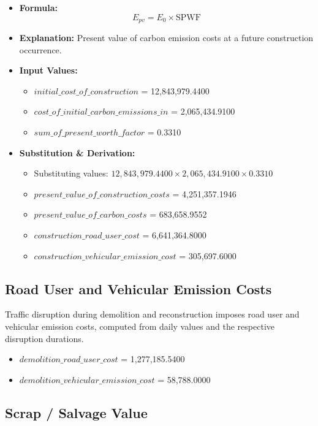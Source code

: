 \documentclass[12pt,a4paper]{article}
\begin{document}
\begin{itemize}
  \item \textbf{Formula:} $$E_{pv} = E_0 \times \text{SPWF}$$
  \item \textbf{Explanation:} Present value of carbon emission costs at a future construction occurrence.
  \item \textbf{Input Values:}
  \begin{itemize}
    \item $initial\_cost\_of\_construction$ = 12,843,979.4400
    \item $cost\_of\_initial\_carbon\_emissions\_in$ = 2,065,434.9100
    \item $sum\_of\_present\_worth\_factor$ = 0.3310
  \end{itemize}
  \item \textbf{Substitution \& Derivation:}
  \begin{itemize}
    \item Substituting values: $12,843,979.4400 \times 2,065,434.9100 \times 0.3310$
    \item $present\_value\_of\_construction\_costs$ = 4,251,357.1946
    \item $present\_value\_of\_carbon\_costs$ = 683,658.9552
    \item $construction\_road\_user\_cost$ = 6,641,364.8000
    \item $construction\_vehicular\_emission\_cost$ = 305,697.6000
  \end{itemize}
\end{itemize}


\subsection{Road User and Vehicular Emission Costs}

Traffic disruption during demolition and reconstruction imposes road user and vehicular emission costs, computed from daily values and the respective disruption durations.


\begin{itemize}
  \item $demolition\_road\_user\_cost$ = 1,277,185.5400
  \item $demolition\_vehicular\_emission\_cost$ = 58,788.0000
\end{itemize}

\subsection{Scrap / Salvage Value}
\end{document}

